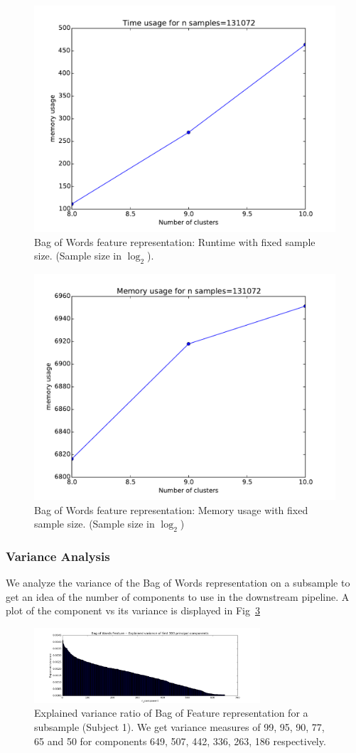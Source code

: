 \documentclass[final,leqno,onefignum,onetabnum]{siamltexmm}
\begin{document}
\begin{figure}
  \centering
  \includegraphics[width=0.60\linewidth]{images/bofwTimeFixedSample}
  \caption{Bag of Words feature representation: Runtime with fixed sample size. (Sample size in $\log_{2}$).\label{fig:bowf_time_fixed_sample}}
\end{figure}
\begin{figure}
  \centering
  \includegraphics[width=0.60\linewidth]{images/bofwMemoryFixedSample}
  \caption{Bag of Words feature representation: Memory usage with fixed sample size. (Sample size in $\log_{2}$)\label{fig:bowf_memory_fixed_sample}}
\end{figure}

\subsubsection{Variance Analysis}
We analyze the variance of the Bag of Words representation on a subsample to get an idea of the number of components to use in the downstream pipeline.  A plot of the component vs its variance is displayed in Fig~\ref{fig:bowf_variance}
\begin{figure}
  \centering
  \includegraphics[width=0.75\textwidth]{images/bowf_variance}
  \caption{Explained variance ratio of Bag of Feature representation for a subsample (Subject 1).  We get variance measures of 99, 95, 90, 77, 65 and 50 for components 649, 507, 442, 336, 263, 186 respectively.\label{fig:bowf_variance}} 
\end{figure}
\end{document}
